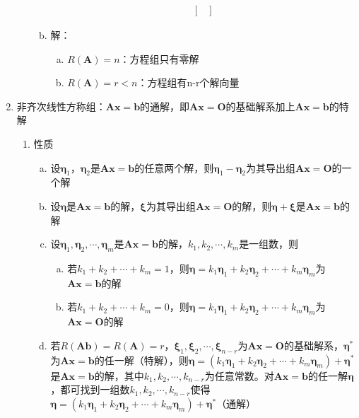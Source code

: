 \documentclass[12pt]{book}
\begin{document}
\begin{enumerate}[1.]
\begin{enumerate}[(1)]
\begin{enumerate}[a.]
\begin{gather*}
\begin{bmatrix}
                                  \end{bmatrix}
                              \end{gather*}
                        \item 解：
                              \begin{enumerate}[(a)]
                                  \item $R(\bm{A})=n$：方程组只有零解
                                  \item $R(\bm{A})=r<n$：方程组有n-r个解向量
                              \end{enumerate}
                    \end{enumerate}
          \end{enumerate}
    \item 非齐次线性方称组：$\bm{Ax}=\bm{b}$的通解，即$\bm{Ax}=\bm{O}$的基础解系加上$\bm{Ax}=\bm{b}$的特解
          \begin{enumerate}[(1)]
              \item 性质
                    \begin{enumerate}[a.]
                        \item 设$\bm{\eta}_1$，$\bm{\eta}_2$是$\bm{Ax}=\bm{b}$的任意两个解，则$\bm{\eta}_1-\bm{\eta}_2$为其导出组$\bm{Ax}=\bm{O}$的一个解
                        \item 设$\bm{\eta}$是$\bm{Ax}=\bm{b}$的解，$\bm{\xi}$为其导出组$\bm{Ax}=\bm{O}$的解，则$\bm{\eta}+\bm{\xi}$是$\bm{Ax}=\bm{b}$的解
                        \item 设$\bm{\eta}_1,\bm{\eta}_2,\cdots,\bm{\eta}_m$是$\bm{Ax}=\bm{b}$的解，$k_1,k_2,\cdots,k_m$是一组数，则
                              \begin{enumerate}[(a)]
                                  \item 若$k_1+k_2+\cdots+k_m=1$，则$\bm{\eta}=k_{1} \bm{\eta}_1 + k_2 \bm{\eta}_2+\cdots+k_m \bm{\eta}_m$为$\bm{Ax}=\bm{b}$的解
                                  \item 若$k_1+k_2+\cdots+k_m=0$，则$\bm{\eta}=k_1 \bm{\eta}_1 + k_2 \bm{\eta}_2+\cdots+k_m \bm{\eta}_m$为$\bm{Ax}=\bm{O}$的解
                              \end{enumerate}
                        \item 若$R(\bm{A b})=R(\bm{A})=r$，$\bm{\xi}_1,\bm{\xi}_2,\cdots,\bm{\xi}_{n-r}$为$\bm{Ax}=\bm{O}$的基础解系，$\bm{\eta}^{*}$为$\bm{Ax}=\bm{b}$的任一解（特解），则$\bm{\eta}=(k_1 \bm{\eta}_1 + k_2 \bm{\eta}_2+\cdots+k_m \bm{\eta}_m)+\bm{\eta}^{*}$是$\bm{Ax}=\bm{b}$的解，其中$k_1,k_2,\cdots,k_{n-r}$为任意常数。对$\bm{Ax}=\bm{b}$的任一解$\bm{\eta}$，都可找到一组数$k_1,k_2,\cdots,k_{n-r}$使得$\bm{\eta}=(k_1 \bm{\eta}_1 + k_2 \bm{\eta}_2+\cdots+k_m \bm{\eta}_m)+\bm{\eta}^{*}$（通解）

\end{enumerate}
\end{enumerate}
\end{enumerate}
\end{document}
